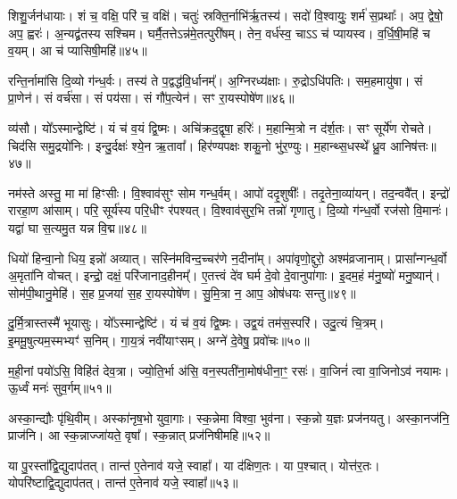 शिशु॒र्जन॑धायाः। 
शं च॒ वक्षि॒ परि॑ च॒ वक्षि॑। 
चतुः॑ स्रक्ति॒र्नाभि॑र्\mbox{}ऋ॒तस्य॑। 
सदो॑ वि॒श्वायुः॒ शर्म॑ स॒प्रथाः᳚। 
अप॒ द्वेषो॒ अप॒ ह्वरः॑। 
अ॒न्यद्व्र॑तस्य सश्चिम। 
घर्मै॒तत्तेऽन्न॑मे॒तत्पुरी॑षम्। 
तेन॒ वर्ध॑स्व॒ चाऽऽ च॑ प्यायस्व। 
व॒र्धि॒षी॒महि॑ च व॒यम्। 
आ च॑ प्यासिषी॒महि॑॥४५॥

रन्ति॒र्नामा॑सि दि॒व्यो ग॑न्ध॒र्वः। 
तस्य॑ ते प॒द्वद्ध॑वि॒र्धानम्᳚। 
अ॒ग्निरध्य॑क्षाः। 
रु॒द्रोऽधि॑पतिः। 
सम॒हमायु॑षा। 
सं प्रा॒णेन॑। 
सं वर्च॑सा। 
सं पय॑सा। 
सं गौ॑प॒त्येन॑। 
सꣳ रा॒यस्पोषे॑ण॥४६॥

व्य॑सौ। 
यो᳚ऽस्मान्द्वेष्टि॑। 
यं च॑ व॒यं द्वि॒ष्मः। 
अचि॑क्रद॒द्वृषा॒ हरिः॑। 
म॒हान्मि॒त्रो न द॑र्\mbox{}श॒तः। 
सꣳ सूर्ये॑ण रोचते। 
चिद॑सि समु॒द्रयो॑निः। 
इन्दु॒र्दक्षः॑ श्ये॒न ऋ॒तावा᳚। 
हिर॑ण्यपक्षः  शकु॒नो भु॑र॒ण्युः। 
म॒हान्थ्स॒धस्थे᳚ ध्रु॒व आनिष॑त्तः॥४७॥

नम॑स्ते अस्तु॒ मा मा॑ हिꣳसीः। 
वि॒श्वाव॑सुꣳ सोम गन्ध॒र्वम्। 
आपो॑ ददृ॒शुषीः᳚। 
तदृ॒तेना॒व्या॑यन्। 
तद॒न्ववै᳚त्। 
इन्द्रो॑ रारहा॒ण आ॑साम्। 
परि॒ सूर्य॑स्य परि॒धीꣳ र॑पश्यत्। 
वि॒श्वाव॑सुर॒भि तन्नो॑ गृणातु। 
दि॒व्यो ग॑न्ध॒र्वो रज॑सो वि॒मानः॑। 
यद्वा॑ घा स॒त्यमु॒त यन्न वि॒द्म॥४८॥

धियो॑ हिन्वा॒नो धिय॒ इन्नो॑ अव्यात्। 
सस्नि॑मविन्द॒च्चर॑णे न॒दीना᳚म्। 
अपा॑वृणो॒द्दुरो॒ अश्म॑व्रजानाम्। 
प्रासा᳚न्गन्ध॒र्वो अ॒मृता॑नि वोचत्। 
इन्द्रो॒ दक्षं॒ परि॑जानाद॒हीनम्᳚। 
ए॒तत्त्वं दे॑व घर्म दे॒वो दे॒वानुपा॑गाः। 
इ॒दम॒हं म॑नु॒ष्यो॑ मनु॒ष्यान्॑। 
सोम॑पी॒थानु॒मेहि॑। 
स॒ह प्र॒जया॑ स॒ह रा॒यस्पोषे॑ण। 
सु॒मि॒त्रा न॒ आप॒ ओष॑धयः सन्तु॥४९॥

दु॒र्मि॒त्रास्तस्मै॑ भूयासुः। 
यो᳚ऽस्मान्द्वेष्टि॑। 
यं च॑ व॒यं द्वि॒ष्मः। 
उद्व॒यं तम॑स॒स्परि॑। 
उदु॒त्यं चि॒त्रम्। 
इ॒ममू॒षुत्यम॒स्मभ्यꣳ॑ स॒निम्। 
गा॒य॒त्रं नवी॑याꣳसम्। 
अग्ने॑ दे॒वेषु॒ प्रवो॑चः॥५०॥
\anuvakamend[याऽऽग्नी᳚ध्रे॒ तान्त॑ ए॒तेनाव॑ यजे॒ स्वाहा॒ धर्म॑णा शं॒ युधा॑याः प्यासिषी॒महि॒ पोषे॑ण॒ निष॑त्तो वि॒द्म स॑न्त्व॒ष्टौ]

म॒ही॒नां पयो॑ऽसि॒ विहि॑तं देव॒त्रा। 
ज्यो॒ति॒र्भा अ॑सि॒ वन॒स्पती॑ना॒\-मोष॑धीना॒ꣳ॒ रसः॑। 
वा॒जिनं॑ त्वा वा॒जिनोऽव॑ नयामः। 
ऊ॒र्ध्वं मनः॑ सुव॒र्गम्॥५१॥
\anuvakamend

अस्का॒न्द्यौः पृ॑थि॒वीम्। 
अस्का॑नृष॒भो युवा॒गाः। 
स्क॒न्नेमा विश्वा॒ भुव॑ना। 
स्क॒न्नो य॒ज्ञः प्रज॑नयतु। 
अस्का॒नज॑नि॒ प्राज॑नि। 
आ स्क॒न्नाज्जा॑यते॒ वृषा᳚। 
स्क॒न्नात् प्रज॑निषीमहि॥५२॥
\anuvakamend

या पु॒रस्ता᳚द्वि॒द्युदाप॑तत्। 
तान्त॑ ए॒तेनाव॑ यजे॒ स्वाहा᳚। 
या द॑क्षिण॒तः। 
या प॒श्चात्। 
योत्त॑र॒तः। 
योपरि॑ष्टाद्वि॒द्युदाप॑तत्। 
तान्त॑ ए॒तेनाव॑ यजे॒ स्वाहा᳚॥५३॥
\anuvakamend


